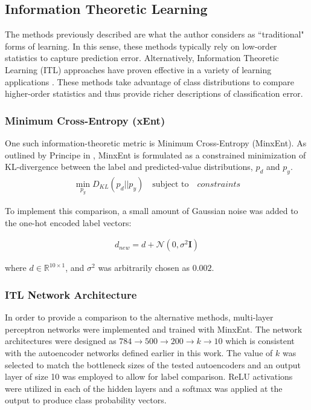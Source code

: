 \documentclass[conference]{IEEEtran}
\begin{document}
	 
	 
	 \subsection{Information Theoretic Learning}
	 The methods previously described are what the author considers as ``traditional" forms of learning.  In this sense, these methods typically rely on low-order statistics to capture prediction error.  Alternatively, Information Theoretic Learning (ITL) approaches have proven effective in a variety of learning applications \cite{Principe2010ITL}.  These methods take advantage of class distributions to compare higher-order statistics and thus provide richer  descriptions of classification error.
	 
	 \subsubsection*{Minimum Cross-Entropy (xEnt)}
	 One such information-theoretic metric is Minimum Cross-Entropy (MinxEnt).  As outlined by Principe in \cite{Principe2010ITL}, MinxEnt is formulated as a constrained minimization of KL-divergence between the label and predicted-value distributions, $p_d$ and $p_y$. 
	 \begin{align}
	 	\min_{p_y}D_{KL}(p_d||p_y) \quad \text{subject to} \quad constraints
	 \end{align} 
	 
	 \noindent To implement this comparison, a small amount of Gaussian noise was added to the one-hot encoded label vectors:
	 
	 \begin{align}
	 	d_{new} = d + \mathcal{N}(0,\sigma^2\mathbf{I})
	 \end{align}
	 
	 \noindent where $d\in\mathbb{R}^{10\times1}$, and $\sigma^2$ was arbitrarily chosen as $0.002$.
	 
	 \subsubsection*{ITL Network Architecture}
	 In order to provide a comparison to the alternative methods, multi-layer perceptron networks were implemented and trained with MinxEnt.  The network architectures were designed as $784 \rightarrow 500 \rightarrow 200 \rightarrow k \rightarrow 10$ which is consistent with the autoencoder networks defined earlier in this work.  The value of $k$ was selected to match the bottleneck sizes of the tested autoencoders and an output layer of size 10 was employed to allow for label comparison.  ReLU activations were utilized in each of the hidden layers and a softmax was applied at the output to produce class probability vectors.
	 
\end{document}
